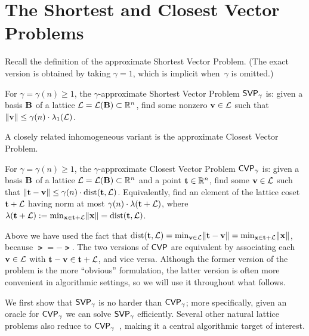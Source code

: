 \documentclass[11pt]{article}
\begin{document}
\thispagestyle{fancy} %


\section{The Shortest and Closest Vector Problems}
\label{sec:svp-cvp}

Recall the definition of the approximate Shortest Vector Problem. (The
exact version is obtained by taking $\gamma=1$, which is implicit
when~$\gamma$ is omitted.)

\begin{definition}
  \label{def:svp}
  For $\gamma = \gamma(n) \geq 1$, the $\gamma$-approximate Shortest
  Vector Problem $\mathsf{SVP}_{\gamma}$ is: given a basis $\mathbf{B}$ of a
  lattice $\mathcal{L} = \mathcal{L}(\mathbf{B}) \subset \mathbb{R}^{n}$, find some nonzero
  $\mathbf{v} \in \mathcal{L}$ such that
  $\lVert\mathbf{v}\rVert \leq \gamma(n) \cdot \lambda_{1}(\mathcal{L})$.
\end{definition}

\noindent A closely related inhomogeneous variant is the approximate
Closest Vector Problem.

\begin{definition}
  \label{def:cvp}
  For $\gamma = \gamma(n) \geq 1$, the $\gamma$-approximate Closest
  Vector Problem $\mathsf{CVP}_{\gamma}$ is: given a basis $\mathbf{B}$ of a
  lattice $\mathcal{L} = \mathcal{L}(\mathbf{B}) \subset \mathbb{R}^{n}$ and a point
  $\mathbf{t} \in \mathbb{R}^{n}$, find some $\mathbf{v} \in \mathcal{L}$ such that
  $\lVert\mathbf{t} - \mathbf{v}\rVert \leq \gamma(n) \cdot \operatorname{dist}(\mathbf{t},\mathcal{L})$.
  Equivalently, find an element of the lattice coset $\mathbf{t} + \mathcal{L}$
  having norm at most $\gamma(n) \cdot \lambda(\mathbf{t}+\mathcal{L})$, where
  $\lambda(\mathbf{t}+\mathcal{L}) := \min_{\mathbf{x} \in \mathbf{t}+\mathcal{L}} \lVert\mathbf{x}\rVert =
  \operatorname{dist}(\mathbf{t},\mathcal{L})$.
\end{definition}

Above we have used the fact that
$\operatorname{dist}(\mathbf{t}, \mathcal{L}) = \min_{\mathbf{v} \in \mathcal{L}} \lVert\mathbf{t} - \mathbf{v}\rVert =
\min_{\mathbf{x} \in \mathbf{t}+\mathcal{L}} \lVert\mathbf{x}\rVert$, because $\lat = -\lat$.
The two versions of $\mathsf{CVP}$ are equivalent by associating each
$\mathbf{v} \in \mathcal{L}$ with $\mathbf{t} - \mathbf{v} \in \mathbf{t} + \mathcal{L}$, and vice
versa. Although the former version of the problem is the more
``obvious'' formulation, the latter version is often more convenient
in algorithmic settings, so we will use it throughout what follows.

We first show that $\mathsf{SVP}_{\gamma}$ is no harder than $\mathsf{CVP}_{\gamma}$;
more specifically, given an oracle for $\mathsf{CVP}_{\gamma}$ we can solve
$\mathsf{SVP}_{\gamma}$ efficiently. Several other natural lattice problems
also reduce to $\mathsf{CVP}_{\gamma}$~\cite{DBLP:conf/soda/Micciancio08},
making it a central algorithmic target of interest.
\end{document}
